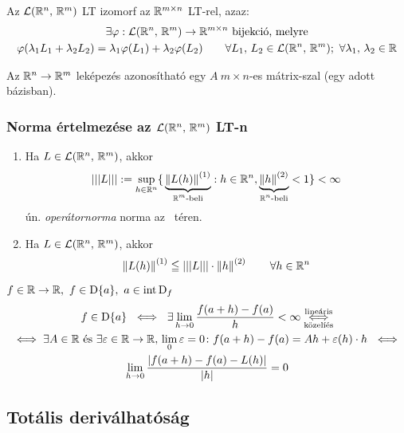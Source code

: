 \begin{te}
  Az $\mathcal{L}(\mathbb{R}^n,\,\mathbb{R}^m)$ LT izomorf  az $\mathbb{R}^{m\times n}$ LT-rel, azaz: 
  \begin{gather*}
    \exists \varphi: \mathcal{L}(\mathbb{R}^n,\,\mathbb{R}^m)\to\mathbb{R}^{m\times n} \text{ bijekció, melyre}\\
    \varphi(\lambda_1 L_1+\lambda_2 L_2) = \lambda_1\varphi(L_1) + \lambda_2 \varphi(L_2)
    \qquad \forall L_1,\,L_2\in\mathcal{L}(\mathbb{R}^n,\,\mathbb{R}^m);\ \forall \lambda_1,\,\lambda_2\in\mathbb{R}
  \end{gather*}
\end{te}

\begin{megj}
  Az $\mathbb{R}^n\to\mathbb{R}^m$ leképezés azonosítható egy $A\ m\times n$-es mátrix-szal (egy adott bázisban).
\end{megj}

\subsubsection{Norma értelmezése az $\mathcal{L}(\mathbb{R}^n,\,\mathbb{R}^m)$ LT-n}

\begin{te}
  \begin{enumerate}
    \item Ha $L\in\mathcal{L}(\mathbb{R}^n,\,\mathbb{R}^m)$, akkor 
      \[\displaystyle |||L||| := \sup_{h\in\mathbb{R}^n}\{\,\underbrace{\left\Vert L(h)\right\Vert^{(1)}}_{\text{$\mathbb{R}^m$-beli}} : h\in\mathbb{R}^n,
      \underbrace{\left\Vert h\right\Vert^{(2)}}_{\text{$\mathbb{R}^n$-beli}}<1\} < \infty\]
      ún. \emph{operátornorma} norma az \Linearis\ téren.
      \item Ha $L\in\mathcal{L}(\mathbb{R}^n,\,\mathbb{R}^m)$, akkor
	\[ \left\Vert L(h)\right\Vert^{(1)} \leqq |||L|||\cdot\left\Vert h\right\Vert^{(2)}\qquad\forall h\in\mathbb{R}^n 
	\]
  \end{enumerate}
\end{te}

\begin{megj}
  $f\in\R\n\R,\  f\in\D\{a\},\ a\in\intD_f$
  \begin{gather*}\displaystyle
    f\in\operatorname{D}\{a\} \ \iff\  \exists \lim_{h\to0} \dfrac {f(a+h)-f(a)}{h} < \infty \overset{\text{lineáris}}{\underset
      {\text{közelíés}}{\iff}}\\\iff \exists A\in \mathbb{R} \text{ és } \exists \varepsilon \in \mathbb{R}\to\mathbb{R},\, \lim_0\varepsilon=0
    \colon f(a+h) -f(a) = Ah + \varepsilon(h)\cdot h \ \iff\\
    \lim_{h\to0}\dfrac{|f(a+h)-f(a)-L(h)|}{|h|} = 0
  \end{gather*}
\end{megj}



\subsection{Totális deriválhatóság}

